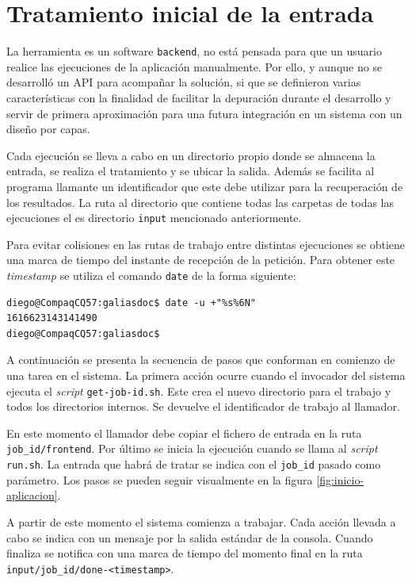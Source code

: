 \section{Tratamiento inicial de la entrada}

La herramienta es un software \verb|backend|, no está pensada para que un usuario realice las ejecuciones de la aplicación manualmente. Por ello, y aunque no se desarrolló un API para acompañar la solución, si que se definieron varias características con la finalidad de facilitar la depuración durante el desarrollo y servir de primera aproximación para una futura integración en un sistema con un diseño por capas.

Cada ejecución se lleva a cabo en un directorio propio donde se almacena la entrada, se realiza el tratamiento y se ubicar la salida. Además se facilita al programa llamante un identificador que este debe utilizar para la recuperación de los resultados. La ruta al directorio que contiene todas las carpetas de todas las ejecuciones el es directorio \verb|input| mencionado anteriormente.

Para evitar colisiones en las rutas de trabajo entre distintas ejecuciones se obtiene una marca de tiempo del instante de recepción de la petición. Para obtener este \emph{timestamp} se utiliza el comando \verb|date| de la forma siguiente:

\begin{verbatim}
diego@CompaqCQ57:galiasdoc$ date -u +"%s%6N"
1616623143141490
diego@CompaqCQ57:galiasdoc$
\end{verbatim}

A continuación se presenta la secuencia de pasos que conforman en comienzo de una tarea en el sistema. La primera acción ocurre cuando el invocador del sistema ejecuta el \emph{script} \verb|get-job-id.sh|. Este crea el nuevo directorio para el trabajo y todos los directorios internos. Se devuelve el identificador de trabajo al llamador.

En este momento el llamador debe copiar el fichero de entrada en la ruta \verb|job_id/frontend|. Por último se inicia la ejecución cuando se llama al \emph{script} \verb|run.sh|. La entrada que habrá de tratar se indica con el \verb|job_id| pasado como parámetro. Los pasos se pueden seguir visualmente en la figura \ref{fig:inicio-aplicacion}. 

A partir de este momento el sistema comienza a trabajar. Cada acción llevada a cabo se indica con un mensaje por la salida estándar de la consola. Cuando finaliza se notifica con una marca de tiempo del momento final en la ruta \verb|input/job_id/done-<timestamp>|.


